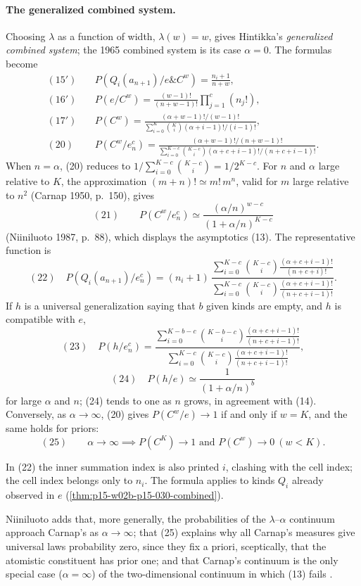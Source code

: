 \paragraph{The generalized combined system.} Choosing \(\lambda\) as a
function of width, \(\lambda(w)=w\), gives Hintikka's \emph{generalized
combined system}; the 1965 combined system is its case \(\alpha=0\). The
formulas become
\[
\begin{aligned}
 (15')\quad& P(Q_i(a_{n+1})/e\&C^w)=\frac{n_i+1}{n+w},\\
 (16')\quad& P(e/C^w)=\frac{(w-1)!}{(n+w-1)!}\prod_{j=1}^c(n_j!),\\
 (17')\quad& P(C^w)=\frac{(\alpha+w-1)!/(w-1)!}
   {\sum_{i=0}^K\binom Ki(\alpha+i-1)!/(i-1)!},\\
 (20)\quad& P(C^w/e^c_n)=\frac{(\alpha+w-1)!/(n+w-1)!}
   {\sum_{i=0}^{K-c}\binom{K-c}{i}(\alpha+c+i-1)!/(n+c+i-1)!}.
\end{aligned}
\]
When \(n=\alpha\), (20) reduces to \(1/\sum_{i=0}^{K-c}\binom{K-c}i=1/2^{K-c}\).
For \(n\) and \(\alpha\) large relative to \(K\), the approximation
\((m+n)!\simeq m!\,m^n\), valid for \(m\) large relative to \(n^2\) (Carnap
1950, p.~150), gives
\[
 (21)\qquad P(C^w/e^c_n)\simeq\frac{(\alpha/n)^{w-c}}{(1+\alpha/n)^{K-c}}
\]
(Niiniluoto 1987, p.~88), which displays the asymptotics (13). The
representative function is
\[
 (22)\quad P(Q_i(a_{n+1})/e^c_n)=(n_i+1)\,
 \frac{\sum_{i=0}^{K-c}\binom{K-c}{i}\frac{(\alpha+c+i-1)!}{(n+c+i)!}}
      {\sum_{i=0}^{K-c}\binom{K-c}{i}\frac{(\alpha+c+i-1)!}{(n+c+i-1)!}}.
\]
If \(h\) is a universal generalization saying that \(b\) given kinds are
empty, and \(h\) is compatible with \(e\),
\[
 (23)\quad P(h/e^c_n)=
 \frac{\sum_{i=0}^{K-b-c}\binom{K-b-c}{i}\frac{(\alpha+c+i-1)!}{(n+c+i-1)!}}
      {\sum_{i=0}^{K-c}\binom{K-c}{i}\frac{(\alpha+c+i-1)!}{(n+c+i-1)!}},
\]
\[
 (24)\quad P(h/e)\simeq\frac1{(1+\alpha/n)^b}
\]
for large \(\alpha\) and \(n\); (24) tends to one as \(n\) grows, in
agreement with (14). Conversely, as \(\alpha\to\infty\), (20) gives
\(P(C^w/e)\to1\) if and only if \(w=K\), and the same holds for priors:
\[
 (25)\qquad \alpha\to\infty\implies P(C^K)\to1\text{ and }P(C^w)\to0\ (w<K).
\]
\cite[pp.~321--322]{Niiniluoto2011HintikkaProgramReading}

In (22) the inner summation index is also printed \(i\), clashing with
the cell index; the cell index belongs only to \(n_i\). The formula
applies to kinds \(Q_i\) already observed in \(e\)
(\cref{thm:p15-w02b-p15-030-combined}).

Niiniluoto adds that, more generally, the probabilities of the
\(\lambda\)--\(\alpha\) continuum approach Carnap's as \(\alpha\to\infty\);
that (25) explains why all Carnap's measures give universal laws
probability zero, since they fix a priori, sceptically, that the
atomistic constituent has prior one; and that Carnap's continuum is the
only special case (\(\alpha=\infty\)) of the two-dimensional continuum in
which (13) fails \cite[p.~322]{Niiniluoto2011HintikkaProgramReading}.

